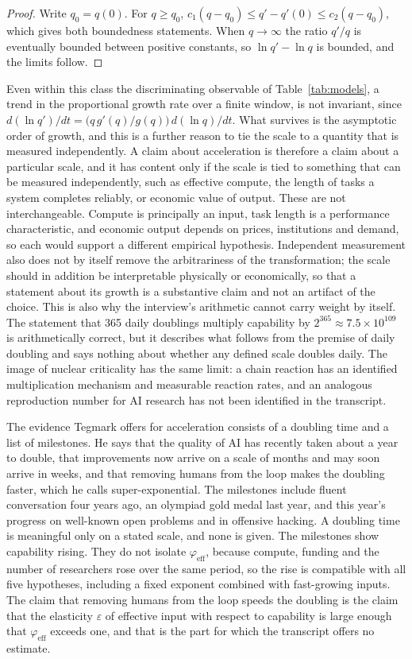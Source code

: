 \documentclass[11pt]{article}
\begin{document}
\begin{proof}
Write $q_0=q(0)$. For $q\ge q_0$, $c_1(q-q_0)\le q'-q'(0)\le c_2(q-q_0)$, which gives both boundedness statements. When $q\to\infty$ the ratio $q'/q$ is eventually bounded between positive constants, so $\ln q'-\ln q$ is bounded, and the limits follow. \qedhere
\end{proof}

Even within this class the discriminating observable of Table~\ref{tab:models}, a trend in the proportional growth rate over a finite window, is not invariant, since $d(\ln q')/dt=\bigl(q\,g'(q)/g(q)\bigr)\,d(\ln q)/dt$. What survives is the asymptotic order of growth, and this is a further reason to tie the scale to a quantity that is measured independently. A claim about acceleration is therefore a claim about a particular scale, and it has content only if the scale is tied to something that can be measured independently, such as effective compute, the length of tasks a system completes reliably, or economic value of output. These are not interchangeable. Compute is principally an input, task length is a performance characteristic, and economic output depends on prices, institutions and demand, so each would support a different empirical hypothesis. Independent measurement also does not by itself remove the arbitrariness of the transformation; the scale should in addition be interpretable physically or economically, so that a statement about its growth is a substantive claim and not an artifact of the choice. This is also why the interview's arithmetic cannot carry weight by itself. The statement that 365 daily doublings multiply capability by $2^{365}\approx 7.5\times10^{109}$ is arithmetically correct, but it describes what follows from the premise of daily doubling and says nothing about whether any defined scale doubles daily. The image of nuclear criticality has the same limit: a chain reaction has an identified multiplication mechanism and measurable reaction rates, and an analogous reproduction number for AI research has not been identified in the transcript.

The evidence Tegmark offers for acceleration consists of a doubling time and a list of milestones. He says that the quality of AI has recently taken about a year to double, that improvements now arrive on a scale of months and may soon arrive in weeks, and that removing humans from the loop makes the doubling faster, which he calls super-exponential. The milestones include fluent conversation four years ago, an olympiad gold medal last year, and this year's progress on well-known open problems and in offensive hacking. A doubling time is meaningful only on a stated scale, and none is given. The milestones show capability rising. They do not isolate $\varphi_{\mathrm{eff}}$, because compute, funding and the number of researchers rose over the same period, so the rise is compatible with all five hypotheses, including a fixed exponent combined with fast-growing inputs. The claim that removing humans from the loop speeds the doubling is the claim that the elasticity $\varepsilon$ of effective input with respect to capability is large enough that $\varphi_{\mathrm{eff}}$ exceeds one, and that is the part for which the transcript offers no estimate.
\end{document}
